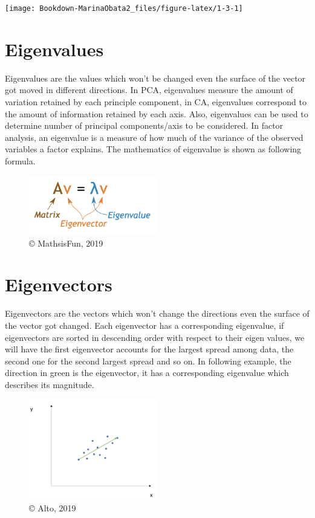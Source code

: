 \documentclass[]{book}
\begin{document}
\texttt{[image: Bookdown-MarinaObata2\_files/figure-latex/1-3-1]}

\hypertarget{eigenvalues}{%
\section{Eigenvalues}\label{eigenvalues}}

Eigenvalues are the values which won't be changed even the surface of the vector got moved in different directions. In PCA, eigenvalues measure the amount of variation retained by each principle component, in CA, eigenvalues correspond to the amount of information retained by each axis. Also, eigenvalues can be used to determine number of principal components/axis to be considered. In factor analysis, an eigenvalue is a measure of how much of the variance of the observed variables a factor explains.
The mathematics of eigenvalue is shown as following formula.

\begin{figure}
\centering
\includegraphics[width=0.5\textwidth,height=\textheight]{eigenvalue.png}
\caption{© MathsisFun, 2019}
\end{figure}

\hypertarget{eigenvectors}{%
\section{Eigenvectors}\label{eigenvectors}}

Eigenvectors are the vectors which won't change the directions even the surface of the vector got changed. Each eigenvector has a corresponding eigenvalue, if eigenvectors are sorted in descending order with respect to their eigen values, we will have the first eigenvector accounts for the largest spread among data, the second one for the second largest spread and so on.
In following example, the direction in green is the eigenvector, it has a corresponding eigenvalue which describes its magnitude.

\begin{figure}
\centering
\includegraphics[width=0.5\textwidth,height=\textheight]{eigens.png}
\caption{© Alto, 2019}
\end{figure}
\end{document}
